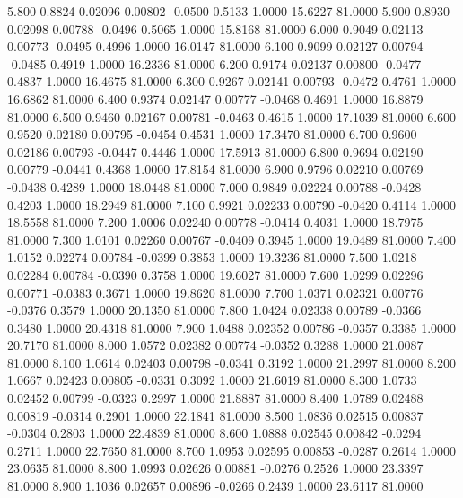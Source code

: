    5.800   0.8824   0.02096   0.00802  -0.0500   0.5133   1.0000  15.6227  81.0000
   5.900   0.8930   0.02098   0.00788  -0.0496   0.5065   1.0000  15.8168  81.0000
   6.000   0.9049   0.02113   0.00773  -0.0495   0.4996   1.0000  16.0147  81.0000
   6.100   0.9099   0.02127   0.00794  -0.0485   0.4919   1.0000  16.2336  81.0000
   6.200   0.9174   0.02137   0.00800  -0.0477   0.4837   1.0000  16.4675  81.0000
   6.300   0.9267   0.02141   0.00793  -0.0472   0.4761   1.0000  16.6862  81.0000
   6.400   0.9374   0.02147   0.00777  -0.0468   0.4691   1.0000  16.8879  81.0000
   6.500   0.9460   0.02167   0.00781  -0.0463   0.4615   1.0000  17.1039  81.0000
   6.600   0.9520   0.02180   0.00795  -0.0454   0.4531   1.0000  17.3470  81.0000
   6.700   0.9600   0.02186   0.00793  -0.0447   0.4446   1.0000  17.5913  81.0000
   6.800   0.9694   0.02190   0.00779  -0.0441   0.4368   1.0000  17.8154  81.0000
   6.900   0.9796   0.02210   0.00769  -0.0438   0.4289   1.0000  18.0448  81.0000
   7.000   0.9849   0.02224   0.00788  -0.0428   0.4203   1.0000  18.2949  81.0000
   7.100   0.9921   0.02233   0.00790  -0.0420   0.4114   1.0000  18.5558  81.0000
   7.200   1.0006   0.02240   0.00778  -0.0414   0.4031   1.0000  18.7975  81.0000
   7.300   1.0101   0.02260   0.00767  -0.0409   0.3945   1.0000  19.0489  81.0000
   7.400   1.0152   0.02274   0.00784  -0.0399   0.3853   1.0000  19.3236  81.0000
   7.500   1.0218   0.02284   0.00784  -0.0390   0.3758   1.0000  19.6027  81.0000
   7.600   1.0299   0.02296   0.00771  -0.0383   0.3671   1.0000  19.8620  81.0000
   7.700   1.0371   0.02321   0.00776  -0.0376   0.3579   1.0000  20.1350  81.0000
   7.800   1.0424   0.02338   0.00789  -0.0366   0.3480   1.0000  20.4318  81.0000
   7.900   1.0488   0.02352   0.00786  -0.0357   0.3385   1.0000  20.7170  81.0000
   8.000   1.0572   0.02382   0.00774  -0.0352   0.3288   1.0000  21.0087  81.0000
   8.100   1.0614   0.02403   0.00798  -0.0341   0.3192   1.0000  21.2997  81.0000
   8.200   1.0667   0.02423   0.00805  -0.0331   0.3092   1.0000  21.6019  81.0000
   8.300   1.0733   0.02452   0.00799  -0.0323   0.2997   1.0000  21.8887  81.0000
   8.400   1.0789   0.02488   0.00819  -0.0314   0.2901   1.0000  22.1841  81.0000
   8.500   1.0836   0.02515   0.00837  -0.0304   0.2803   1.0000  22.4839  81.0000
   8.600   1.0888   0.02545   0.00842  -0.0294   0.2711   1.0000  22.7650  81.0000
   8.700   1.0953   0.02595   0.00853  -0.0287   0.2614   1.0000  23.0635  81.0000
   8.800   1.0993   0.02626   0.00881  -0.0276   0.2526   1.0000  23.3397  81.0000
   8.900   1.1036   0.02657   0.00896  -0.0266   0.2439   1.0000  23.6117  81.0000
